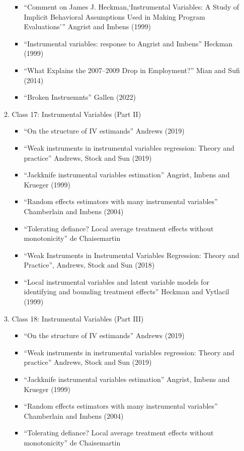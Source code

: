 \documentclass[11pt, a4paper]{article}
\begin{document}
\begin{enumerate}
\begin{enumerate}
\begin{itemize}
    \item ``Comment on James J. Heckman,`Instrumental Variables: A Study of Implicit Behavioral Assumptions Used in Making Program Evaluations''' Angrist and Imbens (1999)
    \item ``Instrumental variables: response to Angrist and Imbens'' Heckman (1999)
    \item ``What Explains the 2007–2009 Drop in Employment?'' Mian and Sufi (2014)
    \item ``Broken Instruemnts'' Gallen (2022)
    \end{itemize}
  \item Class 17: Instrumental Variables (Part II)
    \begin{itemize}
    \item ``On the structure of IV estimands'' Andrews (2019)
    \item ``Weak instruments in instrumental variables regression: Theory and practice'' Andrews, Stock and Sun (2019)
    \item ``Jackknife instrumental variables estimation'' Angrist, Imbens and Krueger (1999)
    \item ``Random effects estimators with many instrumental variables'' Chamberlain and Imbens (2004)
    \item ``Tolerating defiance? Local average treatment effects without monotonicity'' de Chaisemartin
    \item ``Weak Instruments in Instrumental Variables Regression: Theory and Practice'', Andrews, Stock and Sun (2018)
    \item ``Local instrumental variables and latent variable models for identifying and bounding treatment effects'' Heckman and Vytlacil (1999)
    \end{itemize}
  \item Class 18: Instrumental Variables (Part III)
    \begin{itemize}
    \item ``On the structure of IV estimands'' Andrews (2019)
    \item ``Weak instruments in instrumental variables regression: Theory and practice'' Andrews, Stock and Sun (2019)
    \item ``Jackknife instrumental variables estimation'' Angrist, Imbens and Krueger (1999)
    \item ``Random effects estimators with many instrumental variables'' Chamberlain and Imbens (2004)
    \item ``Tolerating defiance? Local average treatment effects without monotonicity'' de Chaisemartin

\end{itemize}
\end{enumerate}
\end{enumerate}
\end{document}
